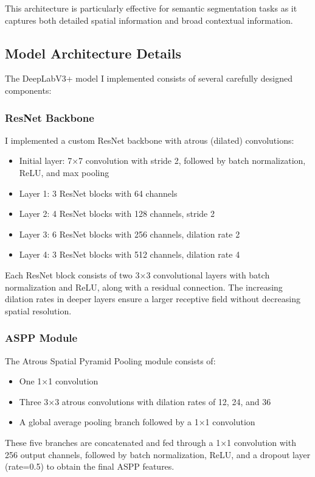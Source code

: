\documentclass[]{article}
\begin{document}
This architecture is particularly effective for semantic segmentation tasks as it captures both detailed spatial information and broad contextual information.

\subsection{Model Architecture Details}
The DeepLabV3+ model I implemented consists of several carefully designed components:

\subsubsection{ResNet Backbone}
I implemented a custom ResNet backbone with atrous (dilated) convolutions:
\begin{itemize}
    \item Initial layer: 7×7 convolution with stride 2, followed by batch normalization, ReLU, and max pooling
    \item Layer 1: 3 ResNet blocks with 64 channels
    \item Layer 2: 4 ResNet blocks with 128 channels, stride 2
    \item Layer 3: 6 ResNet blocks with 256 channels, dilation rate 2
    \item Layer 4: 3 ResNet blocks with 512 channels, dilation rate 4
\end{itemize}

Each ResNet block consists of two 3×3 convolutional layers with batch normalization and ReLU, along with a residual connection. The increasing dilation rates in deeper layers ensure a larger receptive field without decreasing spatial resolution.

\subsubsection{ASPP Module}
The Atrous Spatial Pyramid Pooling module consists of:
\begin{itemize}
    \item One 1×1 convolution
    \item Three 3×3 atrous convolutions with dilation rates of 12, 24, and 36
    \item A global average pooling branch followed by a 1×1 convolution
\end{itemize}

These five branches are concatenated and fed through a 1×1 convolution with 256 output channels, followed by batch normalization, ReLU, and a dropout layer (rate=0.5) to obtain the final ASPP features.
\end{document}
